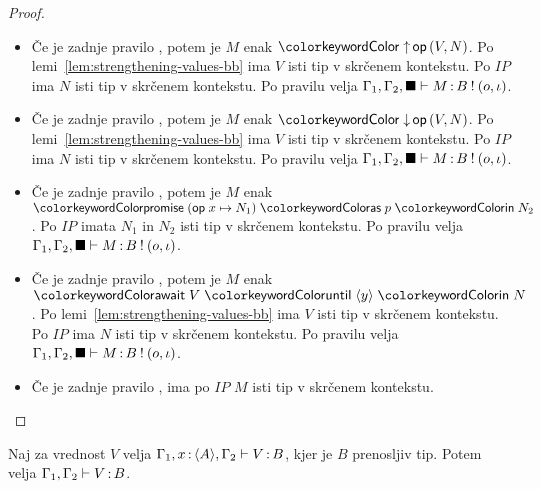 \begin{proof}
\begin{itemize}
		\item Če je zadnje pravilo , potem je $M$ enak $\tmopout{op}{V}{N}$.
		Po lemi~\ref{lem:strengthening-values-bb} ima $V$ isti tip v skrčenem kontekstu.
		Po $IP$ ima $N$ isti tip v skrčenem kontekstu.
		Po pravilu  velja $\Gamma_1, \Gamma_2, \blacksquare \vdash M \mathinner{:} B \mathbin{!} (o, \iota)$.
		
		\item Če je zadnje pravilo , potem je $M$ enak $\tmopin{op}{V}{N}$.
		Po lemi~\ref{lem:strengthening-values-bb} ima $V$ isti tip v skrčenem kontekstu.
		Po $IP$ ima $N$ isti tip v skrčenem kontekstu.
		Po pravilu  velja $\Gamma_1, \Gamma_2, \blacksquare \vdash M \mathinner{:} B \mathbin{!} (o, \iota)$.
		
		\item Če je zadnje pravilo , potem je $M$ enak $\tmwith{op}{x}{N_1}{p}{N_2}$.
		Po $IP$ imata $N_1$ in $N_2$ isti tip v skrčenem kontekstu.
		Po pravilu  velja $\Gamma_1, \Gamma_2, \blacksquare \vdash M \mathinner{:} B \mathbin{!} (o, \iota)$.
		
		\item Če je zadnje pravilo , potem je $M$ enak $\tmawait{V}{y}{N}$.
		Po lemi~\ref{lem:strengthening-values-bb} ima $V$ isti tip v skrčenem kontekstu.
		Po $IP$ ima $N$ isti tip v skrčenem kontekstu.
		Po pravilu  velja $\Gamma_1, \Gamma_2, \blacksquare \vdash M \mathinner{:} B \mathbin{!} (o, \iota)$.
		
		\item Če je zadnje pravilo , ima po $IP$ $M$ isti tip v skrčenem kontekstu.
		
	\end{itemize}
\end{proof}

\begin{lema}\label{lem:tovor-osnovni-tip-skrcitev-2}
	Naj za vrednost $V$ velja $\Gamma_1, x \mathinner{:} \langle A \rangle, \Gamma_2 \vdash V \mathinner{:} B$, kjer je $B$ prenosljiv tip. Potem velja $\Gamma_1, \Gamma_2 \vdash V \mathinner{:} B$.
\end{lema}


